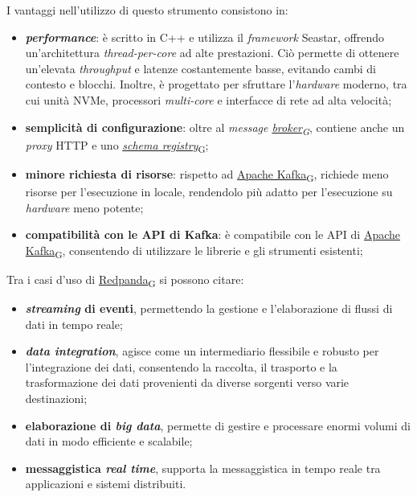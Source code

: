 I vantaggi nell'utilizzo di questo strumento consistono in:
\begin{itemize}
	\item \textbf{\textit{performance}}: è scritto in C++ e utilizza il \textit{framework} Seastar, offrendo un'architettura \textit{thread-per-core} ad alte prestazioni.
	      Ciò permette di ottenere un'elevata \textit{throughput} e latenze costantemente basse, evitando cambi di contesto e blocchi.
	      Inoltre, è progettato per sfruttare l'\textit{hardware} moderno, tra cui unità NVMe, processori \textit{multi-core} e interfacce di rete ad alta velocità;
	\item \textbf{semplicità di configurazione}: oltre al \textit{message \href{https://7last.github.io/docs/pb/documentazione-interna/glossario\#broker}{broker\textsubscript{G}}}, contiene anche un \textit{proxy} HTTP e uno \href{https://7last.github.io/docs/pb/documentazione-interna/glossario\#schema-registry}{\textit{schema registry}\textsubscript{G}};
	\item \textbf{minore richiesta di risorse}: rispetto ad \href{https://7last.github.io/docs/pb/documentazione-interna/glossario\#apache-kafka}{Apache Kafka\textsubscript{G}}, richiede meno risorse per l'esecuzione in locale, rendendolo più adatto per l'esecuzione su \textit{hardware} meno potente;
	\item \textbf{compatibilità con le API di Kafka}: è compatibile con le API di \href{https://7last.github.io/docs/pb/documentazione-interna/glossario\#apache-kafka}{Apache Kafka\textsubscript{G}}, consentendo di utilizzare le librerie e gli strumenti esistenti;
\end{itemize}
Tra i casi d'uso di \href{https://7last.github.io/docs/pb/documentazione-interna/glossario\#redpanda}{Redpanda\textsubscript{G}} si possono citare:
\begin{itemize}
	\item \textbf{\textit{streaming} di eventi}, permettendo la gestione e l'elaborazione di flussi di dati in tempo reale;
	\item \textbf{\textit{data integration}}, agisce come un intermediario flessibile e robusto per l'integrazione dei dati, consentendo la raccolta, il trasporto e la trasformazione dei dati provenienti da diverse sorgenti verso varie destinazioni;
	\item \textbf{elaborazione di \textit{big data}}, permette di gestire e processare enormi volumi di dati in modo efficiente e scalabile;
	\item \textbf{messaggistica \textit{real time}}, supporta la messaggistica in tempo reale tra applicazioni e sistemi distribuiti.
\end{itemize}


